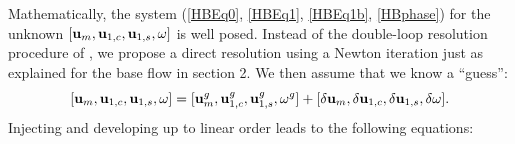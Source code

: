 \documentclass[twocolumn,10pt]{asme2ej}
\begin{document}
Mathematically, the system (\ref{HBEq0}, \ref{HBEq1}, \ref{HBEq1b}, \ref{HBphase}) for the unknown $[{\bf u }_m, {\bf u }_{1,c}, {\bf u }_{1,s}, \omega]$ is well posed. Instead of the double-loop resolution procedure of \cite{MLugo2014}, we propose a direct resolution using a Newton iteration just as explained for the base flow in section 2. 
We then assume that we know a ``guess'':
$$
[{\bf u }_m, {\bf u }_{1,c}, {\bf u }_{1,s}, \omega] = 
 [{\bf u }_m^g, {\bf u }_{1,c}^g, {\bf u }_{1,s}^g, \omega^g]
+ [\delta {\bf u }_m, \delta {\bf u }_{1,c}, \delta {\bf u }_{1,s}, \delta \omega].
$$
Injecting and developing up to linear order leads to the following equations:

\end{document}
